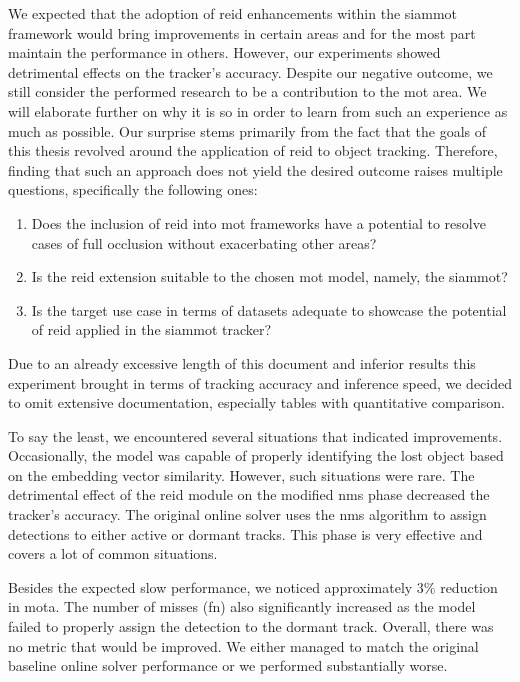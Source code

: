 We expected that the adoption of \gls{reid} enhancements within the \gls{siammot} framework would bring improvements in certain areas and for the most part maintain the performance in others. However, our experiments showed detrimental effects on the tracker's accuracy. Despite our negative outcome, we still consider the performed research to be a contribution to the \gls{mot} area. We will elaborate further on why it is so in order to learn from such an experience as much as possible. Our surprise stems primarily from the fact that the goals of this thesis revolved around the application of \gls{reid} to object tracking. Therefore, finding that such an approach does not yield the desired outcome raises multiple questions, specifically the following ones:
\begin{enumerate}
    \item Does the inclusion of \gls{reid} into \gls{mot} frameworks have a potential to resolve cases of full occlusion without exacerbating other areas?
    \item Is the \gls{reid} extension suitable to the chosen \gls{mot} model, namely, the \gls{siammot}?
    \item Is the target use case in terms of datasets adequate to showcase the potential of \gls{reid} applied in the \gls{siammot} tracker?
\end{enumerate}

Due to an already excessive length of this document and inferior results this experiment brought in terms of tracking accuracy and inference speed, we decided to omit extensive documentation, especially tables with quantitative comparison.

To say the least, we encountered several situations that indicated improvements. Occasionally, the model was capable of properly identifying the lost object based on the embedding vector similarity. However, such situations were rare. The detrimental effect of the \gls{reid} module on the modified \gls{nms} phase decreased the tracker's accuracy. The original online solver uses the \gls{nms} algorithm to assign detections to either active or dormant tracks. This phase is very effective and covers a lot of common situations.

Besides the expected slow performance, we noticed approximately $3$\% reduction in \gls{mota}. The number of misses (\gls{fn}) also significantly increased as the model failed to properly assign the detection to the dormant track. Overall, there was no metric that would be improved. We either managed to match the original baseline online solver performance or we performed substantially worse.

